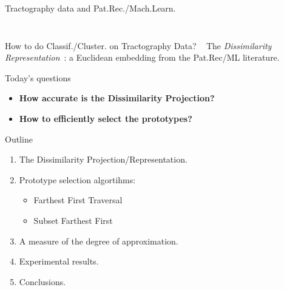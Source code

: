 \documentclass{beamer}
\begin{document}
\begin{frame}{Tractography data and Pat.Rec./Mach.Learn.}
\begin{columns}
\begin{column}{0.4\linewidth}
\begin{figure}
      \end{figure}
    \end{column}
  \end{columns}
  \begin{block}{How to do Classif./Cluster. on Tractography Data?
      ~\cite{olivetti2011supervised}}
    The \emph{Dissimilarity
      Representation}~\cite{pekalska2002generalized}: a Euclidean
    embedding from the Pat.Rec/ML literature.
  \end{block}
\end{frame}

\begin{frame}{Today's questions}
  \begin{itemize}
  \item \textbf{How accurate is the Dissimilarity Projection?}
    \vspace{1em}
  \item \textbf{How to efficiently select the prototypes?}
  \end{itemize}
\end{frame}

\begin{frame}{Outline}
  \begin{enumerate}
  \item The Dissimilarity Projection/Representation.
  \item Prototype selection algortihms:
    \begin{itemize}
    \item Farthest First Traversal
    \item Subset Farthest First
    \end{itemize}
  \item A measure of the degree of approximation.
  \item Experimental results.
  \item Conclusions.
  \end{enumerate}
\end{frame}
\end{document}
